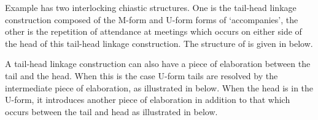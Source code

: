 Example  has two interlocking chiastic structures.
One is the tail-head linkage construction composed
of the M-form and U-form forms of  `accompanies',
the other is the repetition of attendance at meetings which occurs
on either side of the head of this tail-head linkage construction.
The structure of  is given in  below.

\begin{exe}
	\label{ex:DouChi}
		\begin{xlist}
		\end{xlist}
\end{exe}

A tail-head linkage construction can also have a piece of
elaboration between the tail and the head.
When this is the case U-form tails are resolved by the intermediate
piece of elaboration, as illustrated in  below.
When the head is in the U-form, it introduces another piece of elaboration
in addition to that which occurs between the tail and head
as illustrated in  below.

\begin{exe}
	\label{ex:ChiTaiHeaLin-1b-2}
	\label{ex:ChiTaiHeaLin-2b-2}
\end{exe}
